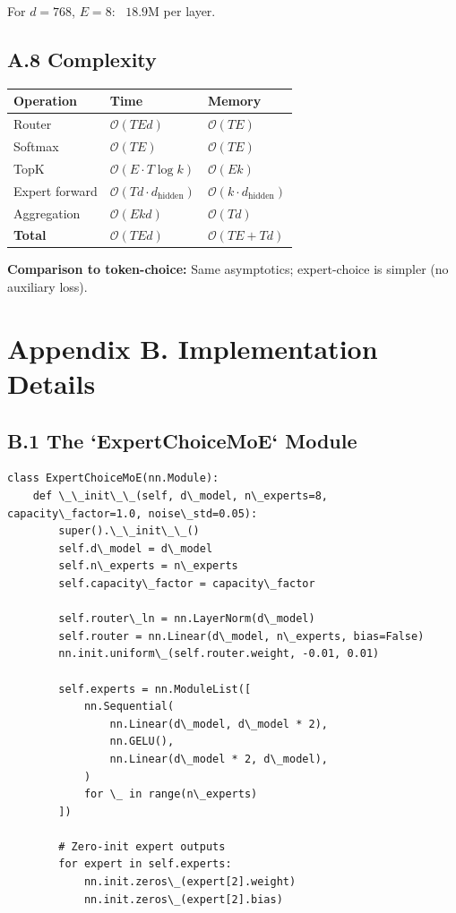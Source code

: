For $d = 768$, $E = 8$: ~$18.9$M per layer.

\subsection{A.8 Complexity}

\begin{table}[H]
\centering
\small
\begin{tabular}{lll}
\toprule
\textbf{Operation} & \textbf{Time} & \textbf{Memory} \\
\midrule
Router & $\mathcal{O}(T E d)$ & $\mathcal{O}(T E)$ \\
Softmax & $\mathcal{O}(T E)$ & $\mathcal{O}(T E)$ \\
TopK & $\mathcal{O}(E \cdot T \log k)$ & $\mathcal{O}(E k)$ \\
Expert forward & $\mathcal{O}(T d \cdot d_\text{hidden})$ & $\mathcal{O}(k \cdot d_\text{hidden})$ \\
Aggregation & $\mathcal{O}(E k d)$ & $\mathcal{O}(T d)$ \\
\textbf{Total} & $\mathcal{O}(T E d)$ & $\mathcal{O}(T E + T d)$ \\
\bottomrule
\end{tabular}
\end{table}

\textbf{Comparison to token-choice:} Same asymptotics; expert-choice is simpler 
(no auxiliary loss).



\section{Appendix B. Implementation Details}

\subsection{B.1 The `ExpertChoiceMoE` Module}

\begin{lstlisting}
class ExpertChoiceMoE(nn.Module):
    def \_\_init\_\_(self, d\_model, n\_experts=8, capacity\_factor=1.0, noise\_std=0.05):
        super().\_\_init\_\_()
        self.d\_model = d\_model
        self.n\_experts = n\_experts
        self.capacity\_factor = capacity\_factor
        
        self.router\_ln = nn.LayerNorm(d\_model)
        self.router = nn.Linear(d\_model, n\_experts, bias=False)
        nn.init.uniform\_(self.router.weight, -0.01, 0.01)
        
        self.experts = nn.ModuleList([
            nn.Sequential(
                nn.Linear(d\_model, d\_model * 2),
                nn.GELU(),
                nn.Linear(d\_model * 2, d\_model),
            )
            for \_ in range(n\_experts)
        ])
        
        # Zero-init expert outputs
        for expert in self.experts:
            nn.init.zeros\_(expert[2].weight)
            nn.init.zeros\_(expert[2].bias)
\end{lstlisting}

